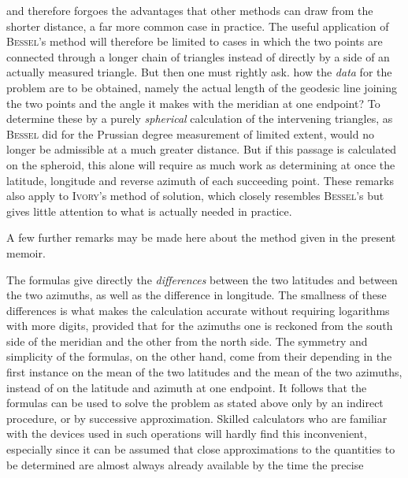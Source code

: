 %
and therefore forgoes the advantages that other methods can draw from the shorter distance, a far more common case in practice. The useful application of \textsc{Bessel}'s method will therefore be limited to cases in which the two points are connected through a longer chain of triangles instead of directly by a side of an actually measured triangle. But then one must rightly ask. how the \textit{data} for the problem are to be obtained, namely the actual length of the geodesic line joining the two points and the angle it makes with the meridian at one endpoint? To determine these by a purely \textit{spherical} calculation of the intervening triangles, as \textsc{Bessel} did for the Prussian degree measurement of limited extent, would no longer be admissible at a much greater distance. But if this passage is calculated on the spheroid, this alone will require as much work as determining at once the latitude, longitude and reverse azimuth of each succeeding point. These remarks also apply to \textsc{Ivory}'s method of solution, which closely resembles \textsc{Bessel}'s but gives little attention to what is actually needed in practice.

A few further remarks may be made here about the method given in the present memoir.

The formulas give directly the \textit{differences} between the two latitudes and between the two azimuths, as well as the difference in longitude. The smallness of these differences is what makes the calculation accurate without requiring logarithms with more digits, provided that for the azimuths one is reckoned from the south side of the meridian and the other from the north side. The symmetry and simplicity of the formulas, on the other hand, come from their depending in the first instance on the mean of the two latitudes and the mean of the two azimuths, instead of on the latitude and azimuth at one endpoint. It follows that the formulas can be used to solve the problem as stated above only by an indirect procedure, or by successive approximation. Skilled calculators who are familiar with the devices used in such operations will hardly find this inconvenient, especially since it can be assumed that close approximations to the quantities to be determined are almost always already available by the time the precise %
